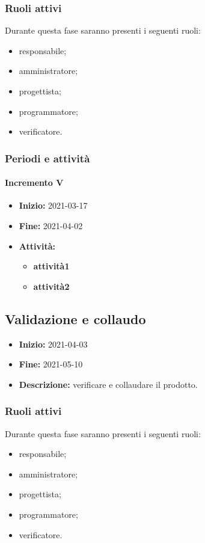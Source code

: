 \subsubsection{Ruoli attivi}
Durante questa fase saranno presenti i seguenti ruoli:
\begin{itemize}
    \item responsabile;
    \item amministratore;
    \item progettista;
    \item programmatore;
    \item verificatore.
\end{itemize}

\subsubsection{Periodi e attività}

\paragraph[Incremento V]{Incremento V}
\begin{itemize}
    \item [] \textbf{Inizio:} 2021-03-17
    \item [] \textbf{Fine:} 2021-04-02
    \item [] \textbf{Attività:}
          \begin{itemize}
              \item \textbf{attività1}
              \item \textbf{attività2}
          \end{itemize}
\end{itemize}


\subsection{Validazione e collaudo} \label{_pianificazioneValidazioneCollaudo}
\begin{itemize}
    \item [] \textbf{Inizio:} 2021-04-03
    \item [] \textbf{Fine:} 2021-05-10
    \item [] \textbf{Descrizione:} verificare e collaudare il prodotto.
\end{itemize}

\subsubsection{Ruoli attivi}
Durante questa fase saranno presenti i seguenti ruoli:
\begin{itemize}
    \item responsabile;
    \item amministratore;
    \item progettista;
    \item programmatore;
    \item verificatore.
\end{itemize}

